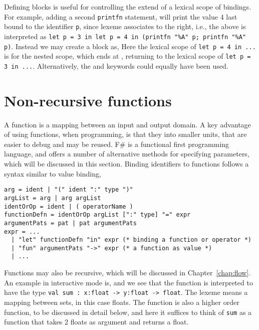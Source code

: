 Defining blocks is useful for controlling the extend of a lexical scope of bindings. For example, adding a second \lstinline!printfn! statement,
%
%
will print the value 4 last bound to the identifier \lstinline!p!, since lexeme \lexeme{;} associates to the right, i.e., the above is interpreted as \lstinline!let p = 3 in let p = 4 in (printfn "%A" p; printfn "%A" p)!. Instead we may create a block as,
%
%
Here the lexical scope of \lstinline!let p = 4 in ...! is for the nested scope, which ends at \lexeme{)}, returning to the lexical scope of \lstinline!let p = 3 in ...!. Alternatively, the  and  keywords could equally have been used.


\section{Non-recursive functions}
\label{sec:functions}
A function is a mapping between an input and output domain. A key advantage of using functions, when programming, is that they  into smaller units, that are easier to debug and may be reused. F\# is a functional first programming language, and offers a number of alternative methods for specifying parameters, which will be discussed in this section. Binding identifiers to functions follows a syntax similar to value binding,
%
\begin{lstlisting}[language=ebnf]
arg = ident | "(" ident ":" type ")"
argList = arg | arg argList
identOrOp = ident | ( operatorName )
functionDefn = identOrOp argList [":" type] "=" expr
argumentPats = pat | pat argumentPats
expr = ... 
  | "let" functionDefn "in" expr (* binding a function or operator *) 
  | "fun" argumentPats "->" expr (* a function as value *)
  | ...
\end{lstlisting}
Functions may also be recursive, which will be discussed in Chapter~\ref{chap:flow}. An example in interactive mode is,
%
%
and we see that the function is interpreted to have the type \lstinline!val sum : x:float -> y:float -> float!. The \lexeme{->} lexeme means a mapping between sets, in this case floats. The function is also a higher order function, to be discussed in detail below, and here it suffices to think of \lstinline!sum! as a function that takes 2 floats as argument and returns a float.


